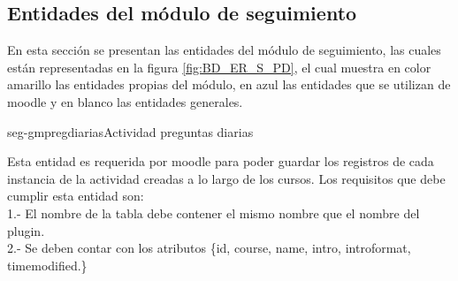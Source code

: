 
\clearpage
\subsection{Entidades del módulo de seguimiento}

 En esta sección se presentan las entidades del módulo de seguimiento,
 las cuales están representadas en la figura  \ref{fig:BD_ER_S_PD},
 el cual muestra en color amarillo las entidades propias del módulo,
 en azul las entidades que se utilizan de moodle  y en blanco las entidades generales.


        \begin{cdtEntidad}{seg-gmpregdiarias}{Actividad preguntas diarias}{

        Esta entidad es requerida por moodle para poder guardar los registros de cada instancia de la actividad creadas a lo largo de los cursos. Los requisitos que debe cumplir esta entidad son:\\
            1.- El nombre de la tabla debe contener el mismo nombre que el nombre del plugin.\\
            2.- Se deben contar con los atributos \{id, course, name, intro, introformat, timemodified.\}
            }




\end{cdtEntidad}
